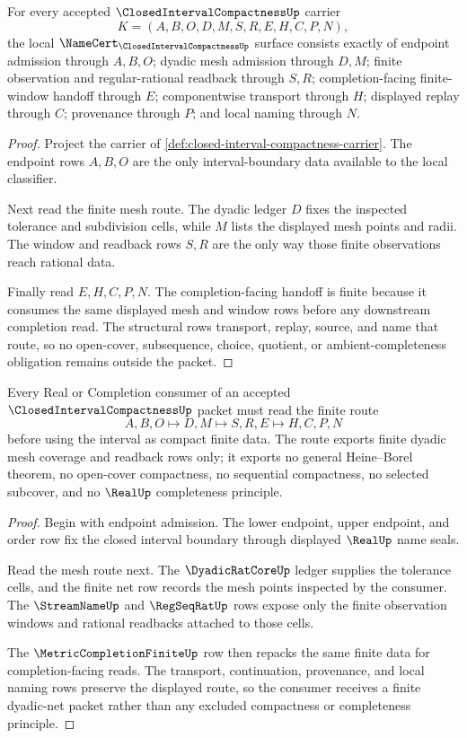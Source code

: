 \begin{theorem}
\label{thm:closed-interval-compactness-namecert-obligations}
For every accepted $\ClosedIntervalCompactnessUp$ carrier
$$
K=(A,B,O,D,M,S,R,E,H,C,P,N),
$$
the local $\NameCert_{\ClosedIntervalCompactnessUp}$ surface consists exactly of endpoint admission through $A,B,O$; dyadic mesh admission through $D,M$; finite observation and regular-rational readback through $S,R$; completion-facing finite-window handoff through $E$; componentwise transport through $H$; displayed replay through $C$; provenance through $P$; and local naming through $N$.
\end{theorem}
\begin{proof}
Project the carrier of \autoref{def:closed-interval-compactness-carrier}. The endpoint rows $A,B,O$ are the only interval-boundary data available to the local classifier.

Next read the finite mesh route. The dyadic ledger $D$ fixes the inspected tolerance and subdivision cells, while $M$ lists the displayed mesh points and radii. The window and readback rows $S,R$ are the only way those finite observations reach rational data.

Finally read $E,H,C,P,N$. The completion-facing handoff is finite because it consumes the same displayed mesh and window rows before any downstream completion read. The structural rows transport, replay, source, and name that route, so no open-cover, subsequence, choice, quotient, or ambient-completeness obligation remains outside the packet.
\end{proof}

\begin{theorem}
\label{thm:closed-interval-compactness-dyadic-net-route}
Every Real or Completion consumer of an accepted $\ClosedIntervalCompactnessUp$ packet must read the finite route
$$
A,B,O \longmapsto D,M \longmapsto S,R,E \longmapsto H,C,P,N
$$
before using the interval as compact finite data. The route exports finite dyadic mesh coverage and readback rows only; it exports no general Heine--Borel theorem, no open-cover compactness, no sequential compactness, no selected subcover, and no $\RealUp$ completeness principle.
\end{theorem}
\begin{proof}
Begin with endpoint admission. The lower endpoint, upper endpoint, and order row fix the closed interval boundary through displayed $\RealUp$ name seals.

Read the mesh route next. The $\DyadicRatCoreUp$ ledger supplies the tolerance cells, and the finite net row records the mesh points inspected by the consumer. The $\StreamNameUp$ and $\RegSeqRatUp$ rows expose only the finite observation windows and rational readbacks attached to those cells.

The $\MetricCompletionFiniteUp$ row then repacks the same finite data for completion-facing reads. The transport, continuation, provenance, and local naming rows preserve the displayed route, so the consumer receives a finite dyadic-net packet rather than any excluded compactness or completeness principle.
\end{proof}

